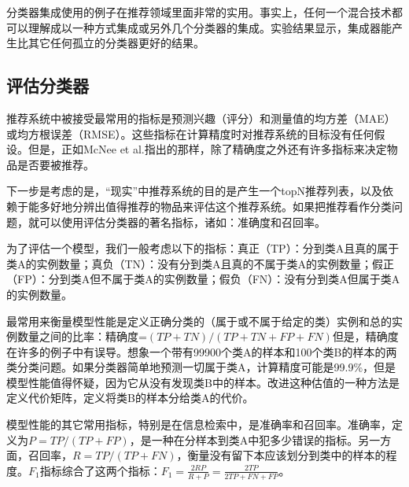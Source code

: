 \documentclass{article}
\begin{document}
分类器集成使用的例子在推荐领域里面非常的实用。事实上，任何一个混合技术都可以理解成以一种方式集成或另外几个分类器的集成。实验结果显示，集成器能产生比其它任何孤立的分类器更好的结果。

\subsection{评估分类器}
推荐系统中被接受最常用的指标是预测兴趣（评分）和测量值的均方差（MAE）或均方根误差（RMSE）。这些指标在计算精度时对推荐系统的目标没有任何假设。但是，正如McNee et al.指出的那样，除了精确度之外还有许多指标来决定物品是否要被推荐。

下一步是考虑的是，“现实”中推荐系统的目的是产生一个topN推荐列表，以及依赖于能多好地分辨出值得推荐的物品来评估这个推荐系统。如果把推荐看作分类问题，就可以使用评估分类器的著名指标，诸如：准确度和召回率。

为了评估一个模型，我们一般考虑以下的指标：真正（TP）：分到类A且真的属于类A的实例数量；真负（TN）：没有分到类A且真的不属于类A的实例数量；假正（FP）：分到类A但不属于类A的实例数量；假负（FN）：没有分到类A但属于类A的实例数量。

最常用来衡量模型性能是定义正确分类的（属于或不属于给定的类）实例和总的实例数量之间的比率：精确度=$(TP+TN)/(TP+TN+FP+FN)$但是，精确度在许多的例子中有误导。想象一个带有99900个类A的样本和100个类B的样本的两类分类问题。如果分类器简单地预测一切属于类A，计算精度可能是99.9\%，但是模型性能值得怀疑，因为它从没有发现类B中的样本。改进这种估值的一种方法是定义代价矩阵，定义将类B的样本分给类A的代价。

模型性能的其它常用指标，特别是在信息检索中，是准确率和召回率。准确率，定义为$P = TP/(TP+FP)$，是一种在分样本到类A中犯多少错误的指标。另一方面，召回率，$R = TP/(TP+FN)$，衡量没有留下本应该划分到类中的样本的程度。$F_1$指标综合了这两个指标：$F_1=\frac{2RP}{R+P}=\frac{2TP}{2TP+FN+FP}$。
\end{document}

